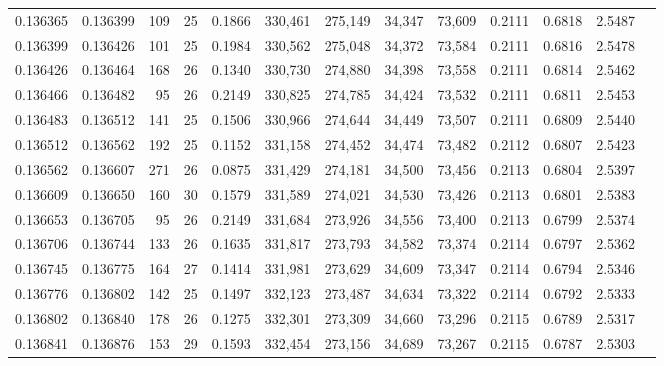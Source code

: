 \begin{tabular}{rrrrrrrrrrrrr}
0.136365 & 0.136399 & 109 &  25 &                                     0.1866 & 330,461 & 275,149 &  34,347 &  73,609 & 0.2111 & 0.6818 & 2.5487 \\
0.136399 & 0.136426 & 101 &  25 &                                     0.1984 & 330,562 & 275,048 &  34,372 &  73,584 & 0.2111 & 0.6816 & 2.5478 \\
0.136426 & 0.136464 & 168 &  26 &                                     0.1340 & 330,730 & 274,880 &  34,398 &  73,558 & 0.2111 & 0.6814 & 2.5462 \\
0.136466 & 0.136482 &  95 &  26 &                                     0.2149 & 330,825 & 274,785 &  34,424 &  73,532 & 0.2111 & 0.6811 & 2.5453 \\
0.136483 & 0.136512 & 141 &  25 &                                     0.1506 & 330,966 & 274,644 &  34,449 &  73,507 & 0.2111 & 0.6809 & 2.5440 \\
0.136512 & 0.136562 & 192 &  25 &                                     0.1152 & 331,158 & 274,452 &  34,474 &  73,482 & 0.2112 & 0.6807 & 2.5423 \\
0.136562 & 0.136607 & 271 &  26 &                                     0.0875 & 331,429 & 274,181 &  34,500 &  73,456 & 0.2113 & 0.6804 & 2.5397 \\
0.136609 & 0.136650 & 160 &  30 &                                     0.1579 & 331,589 & 274,021 &  34,530 &  73,426 & 0.2113 & 0.6801 & 2.5383 \\
0.136653 & 0.136705 &  95 &  26 &                                     0.2149 & 331,684 & 273,926 &  34,556 &  73,400 & 0.2113 & 0.6799 & 2.5374 \\
0.136706 & 0.136744 & 133 &  26 &                                     0.1635 & 331,817 & 273,793 &  34,582 &  73,374 & 0.2114 & 0.6797 & 2.5362 \\
0.136745 & 0.136775 & 164 &  27 &                                     0.1414 & 331,981 & 273,629 &  34,609 &  73,347 & 0.2114 & 0.6794 & 2.5346 \\
0.136776 & 0.136802 & 142 &  25 &                                     0.1497 & 332,123 & 273,487 &  34,634 &  73,322 & 0.2114 & 0.6792 & 2.5333 \\
0.136802 & 0.136840 & 178 &  26 &                                     0.1275 & 332,301 & 273,309 &  34,660 &  73,296 & 0.2115 & 0.6789 & 2.5317 \\
0.136841 & 0.136876 & 153 &  29 &                                     0.1593 & 332,454 & 273,156 &  34,689 &  73,267 & 0.2115 & 0.6787 & 2.5303 \\

\end{tabular}
